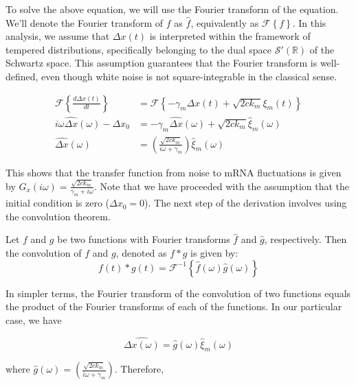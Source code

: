 To solve the above equation, we will use the Fourier transform of the equation. We'll denote the Fourier transform of $f$ as $\hat{f}$, equivalently as $\mathcal{F}\left\{f\right\}$. In this analysis, we assume that $\Delta x(t)$ is interpreted within the framework of tempered distributions, specifically belonging to the dual space $\mathcal{S}'(\mathbb{R})$ of the Schwartz space. This assumption guarantees that the Fourier transform is well-defined, even though white noise is not square-integrable in the classical sense.

\begin{align*}
    \mathcal{F}\left\{\frac{d\Delta x(t)}{dt}\right\} &= \mathcal{F}\left\{-\gamma_m\Delta x(t) + \sqrt{2ck_m}\xi_m(t)\right\}\\
    i\omega\hat{\Delta x}(\omega) - \Delta x_0&= -\gamma_m\hat{\Delta x}(\omega) + \sqrt{2ck_m}\hat{\xi}_m(\omega)\\
    \hat{\Delta x}(\omega) &= \left(\frac{\sqrt{2ck_m}}{i\omega + \gamma_m}\right)\hat{\xi}_m(\omega)
\end{align*}

This shows that the transfer function from noise to mRNA fluctuations is given by $G_x(i\omega) = \frac{\sqrt{2 c k_m}}{\gamma_m + i\omega}$. Note that we have proceeded with the assumption that the initial condition is zero ($\Delta x_0 = 0$). The next step of the derivation involves using the convolution theorem.

\begin{untheorem}
    Let $f$ and $g$ be two functions with Fourier transforms $\hat{f}$ and $\hat{g}$, respectively. Then the convolution of $f$ and $g$, denoted as $f*g$ is given by:
    \begin{equation*}
        f(t)*g(t) = \mathcal{F}^{-1}\left\{\hat{f}(\omega)\hat{g}(\omega)\right\}
    \end{equation*}
\end{untheorem}

In simpler terms, the Fourier transform of the convolution of two functions equals the product of the Fourier transforms of each of the functions. In our particular case, we have 

\begin{equation*}
    \hat{\Delta x(\omega)} = \hat{g}(\omega)\hat{\xi}_m(\omega)
\end{equation*}

where $\hat{g}(\omega) = \left(\frac{\sqrt{2ck_m}}{i\omega + \gamma_m}\right)$. Therefore,

